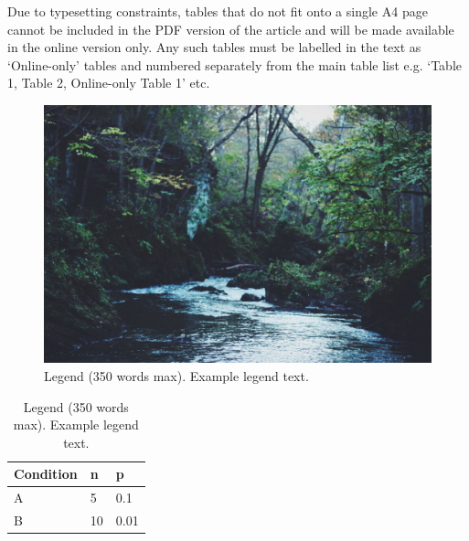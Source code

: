 \documentclass[fleqn,10pt]{wlscirep}
\begin{document}
Due to typesetting constraints, tables that do not fit onto a single A4 page cannot be included in the PDF version of the article and will be made available in the online version only. Any such tables must be labelled in the text as ‘Online-only’ tables and numbered separately from the main table list e.g. ‘Table 1, Table 2, Online-only Table 1’ etc.

\begin{figure}[ht]
\centering
\includegraphics[width=\linewidth]{stream}
\caption{Legend (350 words max). Example legend text.}
\label{fig:stream}
\end{figure}

\begin{table}[ht]
\centering
\begin{tabular}{|l|l|l|}
\hline
Condition & n & p \\
\hline
A & 5 & 0.1 \\
\hline
B & 10 & 0.01 \\
\hline
\end{tabular}
\caption{\label{tab:example}Legend (350 words max). Example legend text.}
\end{table}
\end{document}
